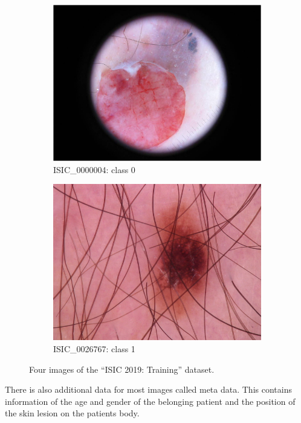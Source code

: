 \begin{figure}
	\begin{subfigure}{.24\textwidth}
		\centering
		\includegraphics[width=.9\linewidth]{pictures/ISIC_0000004.jpg}  
		\caption{ISIC\_0000004: class 0}
		\label{fig:sub-third}
	\end{subfigure}
	\begin{subfigure}{.24\textwidth}
		\centering
		\includegraphics[width=.9\linewidth]{pictures/ISIC_0026767.jpg}  
		\caption{ISIC\_0026767: class 1}
		\label{fig:sub-fourth}
	\end{subfigure}
	\caption{Four images of the ``ISIC 2019: Training'' dataset.}
	\label{fig:dataset}
\end{figure}
There is also additional data for most images called meta data. This contains information of the age and gender of the belonging patient and the position of the skin lesion on the patients body. 
